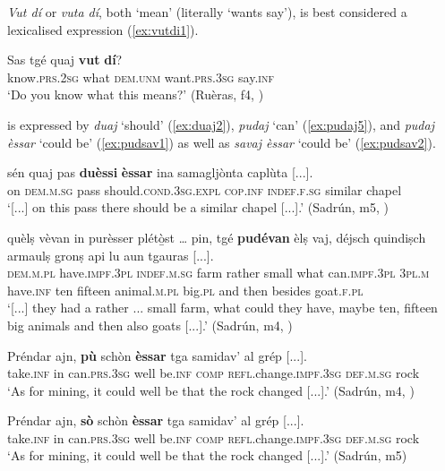 \textit{Vut dí} or \textit{vuta dí}, both `mean'  (literally `wants say'), is best considered a lexicalised expression (\ref{ex:vutdi1}).

\ea
\label{ex:vutdi1}
\gll Sas tgé quaj \textbf{vut} \textbf{dí}?   \\
know.\textsc{prs.2sg} what \textsc{dem.unm} want.\textsc{prs.3sg} say.\textsc{inf}\\
\glt `Do you know what this means?' (Ruèras, f4, )
\z

 is expressed by \textit{duaj} `should'  (\ref{ex:duaj2}), \textit{pudaj} `can'  (\ref{ex:pudaj5}), and \textit{pudaj èssar} `could be' (\ref{ex:pudsav1}) as well as \textit{savaj èssar} `could be' (\ref{ex:pudsav2}).

\ea
\label{ex:duaj2}
\gll   [...] sén quaj pas \textbf{duèssi} \textbf{èssar} ina samagljònta caplùta [...]. \\
{} on \textsc{dem.m.sg} pass should.\textsc{cond.3sg.expl} \textsc{cop.inf} \textsc{indef.f.sg} similar chapel\\
\glt `[...] on this pass there should be a similar chapel [...].' (Sadrún, m5, )
\z

\ea
\label{ex:pudaj5}
\gll   [...] quèlṣ vèvan in purèsser plétò̱st … pin, tgé \textbf{pudévan} èlṣ vaj, déjsch quindiṣch armaulṣ gronṣ api lu aun tgauras [...]. \\
{} \textsc{dem.m.pl} have.\textsc{impf.3pl} \textsc{indef.m.sg} farm rather {} small what can.\textsc{impf.3pl} \textsc{3pl.m} have.\textsc{inf} ten fifteen animal.\textsc{m.pl} big.\textsc{pl} and then besides goat.\textsc{f.pl}\\
\glt `[...] they had a rather ... small farm, what could they have, maybe ten, fifteen big animals and then also goats [...].' (Sadrún, m4, )
\z

\ea
\label{ex:pudsav1}
\gll Préndar ajn, \textbf{pù} schòn \textbf{èssar} tga samidav’ al grép [...].\\
take.\textsc{inf} in can.\textsc{prs.3sg} well be.\textsc{inf}  \textsc{comp} \textsc{refl}.change.\textsc{impf.3sg} \textsc{def.m.sg} rock\\
\glt `As for mining, it could well be that the rock changed [...].' (Sadrún, m4, )
\z

\ea
\label{ex:pudsav2}
\gll Préndar ajn, \textbf{sò} schòn \textbf{èssar} tga samidav’ al grép [...].\\
take.\textsc{inf} in can.\textsc{prs.3sg} well be.\textsc{inf}  \textsc{comp} \textsc{refl}.change.\textsc{impf.3sg} \textsc{def.m.sg} rock\\
\glt `As for mining, it could well be that the rock changed [...].' (Sadrún, m5)
\z

